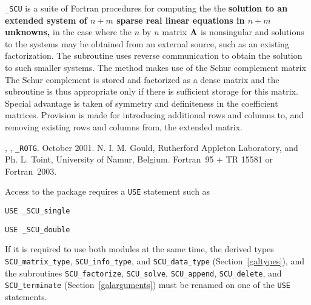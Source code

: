 \documentclass{galahad}
\newcommand{\packagename}{SCU}
\newcommand{\fullpackagename}{\libraryname\-\_\-\packagename}
\begin{document}
\galheader


\galsummary

{\tt \fullpackagename} is a suite of Fortran procedures for 
computing the 
the {\bf solution to an extended system of $n + m$ 
sparse real linear equations in $n  +  m$ unknowns,} 
in the case where the $n$ by $n$ matrix ${\mathbf{A}}$ is nonsingular 
and solutions to the systems 
may be obtained from an external source, such as an existing 
factorization.  The subroutine uses reverse communication to obtain 
the solution to such smaller systems.  The method makes use of 
the Schur complement matrix 
The Schur complement is stored and factorized as a dense matrix 
and the subroutine is thus appropriate only if there is 
sufficient storage for this matrix. Special advantage is taken 
of symmetry and definiteness in the coefficient matrices. 
Provision is made for introducing additional rows and columns 
to, and removing existing rows and columns from, the extended 
matrix. 
 

\galattributes
\galversions{\tt  \fullpackagename\_single, \fullpackagename\_double},
, {\tt \_ROTG}. 
\galdate October 2001.
\galorigin N. I. M. Gould, Rutherford Appleton Laboratory, and
Ph. L. Toint, University of Namur, Belgium.
\gallanguage Fortran~95 + TR 15581 or Fortran~2003. 


\galhowto

Access to the package requires a {\tt USE} statement such as

\medskip{}

\hskip0.5in {\tt USE \fullpackagename\_single}

\medskip{}

\hskip0.5in {\tt USE  \fullpackagename\_double}

\medskip

\noindent
If it is required to use both modules at the same time, the derived types 
{\tt \packagename\_matrix\_type}, 
{\tt \packagename\_info\_type}, and
{\tt \packagename\_data\_type} 
(Section~\ref{galtypes}),
and the subroutines
{\tt \packagename\_factorize},  
{\tt \packagename\_solve},  
{\tt \packagename\_append},  
{\tt \packagename\_delete}, 
and 
{\tt \packagename\_terminate} 
(Section~\ref{galarguments})
must be renamed on one of the {\tt USE} statements.
\end{document}
